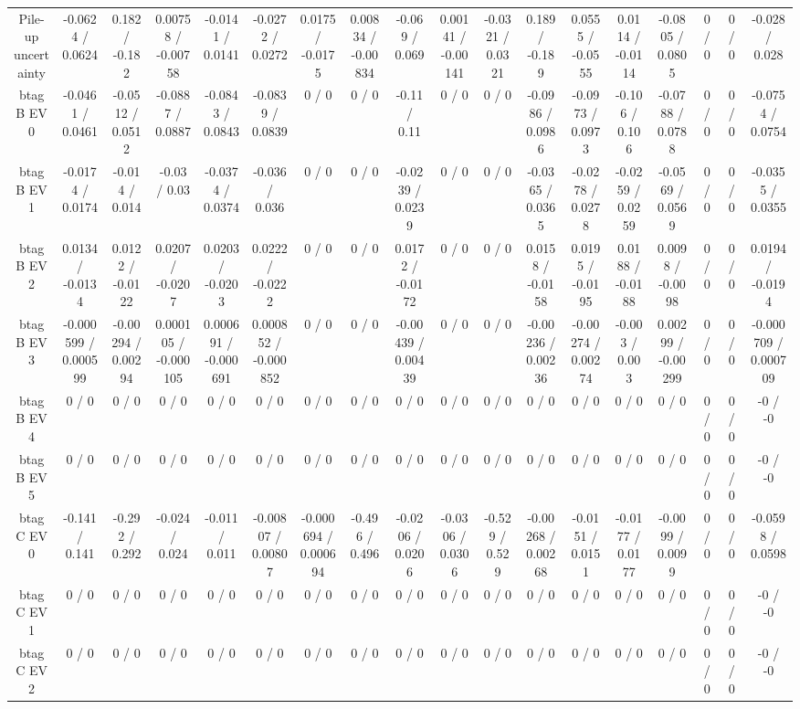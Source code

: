 \documentclass[10pt]{article}
\begin{document}
\begin{table}[htbp]
\begin{center}
\begin{tabular}{|c|c|c|c|c|c|c|c|c|c|c|c|c|c|c|c|c|c|}
  Pile-up uncertainty & -0.0624 / 0.0624 & 0.182 / -0.182 & 0.00758 / -0.00758 & -0.0141 / 0.0141 & -0.0272 / 0.0272 & 0.0175 / -0.0175 & 0.00834 / -0.00834 & -0.069 / 0.069 & 0.00141 / -0.00141 & -0.0321 / 0.0321 & 0.189 / -0.189 & 0.0555 / -0.0555 & 0.0114 / -0.0114 & -0.0805 / 0.0805 & 0 / 0 & 0 / 0 & -0.028 / 0.028 \\ 
  btag B EV 0 & -0.0461 / 0.0461 & -0.0512 / 0.0512 & -0.0887 / 0.0887 & -0.0843 / 0.0843 & -0.0839 / 0.0839 & 0 / 0 & 0 / 0 & -0.11 / 0.11 & 0 / 0 & 0 / 0 & -0.0986 / 0.0986 & -0.0973 / 0.0973 & -0.106 / 0.106 & -0.0788 / 0.0788 & 0 / 0 & 0 / 0 & -0.0754 / 0.0754 \\ 
  btag B EV 1 & -0.0174 / 0.0174 & -0.014 / 0.014 & -0.03 / 0.03 & -0.0374 / 0.0374 & -0.036 / 0.036 & 0 / 0 & 0 / 0 & -0.0239 / 0.0239 & 0 / 0 & 0 / 0 & -0.0365 / 0.0365 & -0.0278 / 0.0278 & -0.0259 / 0.0259 & -0.0569 / 0.0569 & 0 / 0 & 0 / 0 & -0.0355 / 0.0355 \\ 
  btag B EV 2 & 0.0134 / -0.0134 & 0.0122 / -0.0122 & 0.0207 / -0.0207 & 0.0203 / -0.0203 & 0.0222 / -0.0222 & 0 / 0 & 0 / 0 & 0.0172 / -0.0172 & 0 / 0 & 0 / 0 & 0.0158 / -0.0158 & 0.0195 / -0.0195 & 0.0188 / -0.0188 & 0.0098 / -0.0098 & 0 / 0 & 0 / 0 & 0.0194 / -0.0194 \\ 
  btag B EV 3 & -0.000599 / 0.000599 & -0.00294 / 0.00294 & 0.000105 / -0.000105 & 0.000691 / -0.000691 & 0.000852 / -0.000852 & 0 / 0 & 0 / 0 & -0.00439 / 0.00439 & 0 / 0 & 0 / 0 & -0.00236 / 0.00236 & -0.00274 / 0.00274 & -0.003 / 0.003 & 0.00299 / -0.00299 & 0 / 0 & 0 / 0 & -0.000709 / 0.000709 \\ 
  btag B EV 4 & 0 / 0 & 0 / 0 & 0 / 0 & 0 / 0 & 0 / 0 & 0 / 0 & 0 / 0 & 0 / 0 & 0 / 0 & 0 / 0 & 0 / 0 & 0 / 0 & 0 / 0 & 0 / 0 & 0 / 0 & 0 / 0 & -0 / -0 \\ 
  btag B EV 5 & 0 / 0 & 0 / 0 & 0 / 0 & 0 / 0 & 0 / 0 & 0 / 0 & 0 / 0 & 0 / 0 & 0 / 0 & 0 / 0 & 0 / 0 & 0 / 0 & 0 / 0 & 0 / 0 & 0 / 0 & 0 / 0 & -0 / -0 \\ 
  btag C EV 0 & -0.141 / 0.141 & -0.292 / 0.292 & -0.024 / 0.024 & -0.011 / 0.011 & -0.00807 / 0.00807 & -0.000694 / 0.000694 & -0.496 / 0.496 & -0.0206 / 0.0206 & -0.0306 / 0.0306 & -0.529 / 0.529 & -0.00268 / 0.00268 & -0.0151 / 0.0151 & -0.0177 / 0.0177 & -0.0099 / 0.0099 & 0 / 0 & 0 / 0 & -0.0598 / 0.0598 \\ 
  btag C EV 1 & 0 / 0 & 0 / 0 & 0 / 0 & 0 / 0 & 0 / 0 & 0 / 0 & 0 / 0 & 0 / 0 & 0 / 0 & 0 / 0 & 0 / 0 & 0 / 0 & 0 / 0 & 0 / 0 & 0 / 0 & 0 / 0 & -0 / -0 \\ 
  btag C EV 2 & 0 / 0 & 0 / 0 & 0 / 0 & 0 / 0 & 0 / 0 & 0 / 0 & 0 / 0 & 0 / 0 & 0 / 0 & 0 / 0 & 0 / 0 & 0 / 0 & 0 / 0 & 0 / 0 & 0 / 0 & 0 / 0 & -0 / -0 \\ 

\end{tabular}
\end{center}
\end{table}
\end{document}
